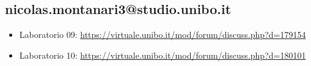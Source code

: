\documentclass[a4paper,12pt]{report}
\begin{document}
\subsection{nicolas.montanari3@studio.unibo.it}

\begin{itemize}
 \item Laboratorio 09: \url{https://virtuale.unibo.it/mod/forum/discuss.php?d=179154}
 \item Laboratorio 10: \url{https://virtuale.unibo.it/mod/forum/discuss.php?d=180101}
\end{itemize}




\end{document}
